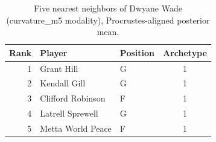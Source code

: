 \begin{table}[htbp]
  \centering\small
  \begin{tabular}{rllc}
    \toprule
    Rank & Player & Position & Archetype \\
    \midrule
    1 & Grant Hill & G & 1 \\
    2 & Kendall Gill & G & 1 \\
    3 & Clifford Robinson & F & 1 \\
    4 & Latrell Sprewell & G & 1 \\
    5 & Metta World Peace & F & 1 \\
    \bottomrule
  \end{tabular}
  \caption{Five nearest neighbors of Dwyane Wade (curvature_m5 modality), Procrustes-aligned posterior mean.}
  \label{tab:Dwyane_Wade_neighbors_curvature_m5}
\end{table}

